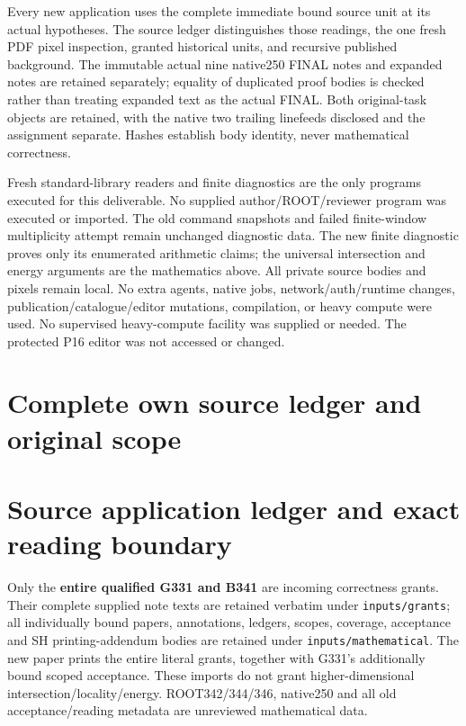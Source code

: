 \documentclass[
]{article}
\begin{document}
Every new application uses the complete immediate bound source unit at
its actual hypotheses. The source ledger distinguishes those readings,
the one fresh PDF pixel inspection, granted historical units, and
recursive published background. The immutable actual nine native250
FINAL notes and expanded notes are retained separately; equality of
duplicated proof bodies is checked rather than treating expanded text as
the actual FINAL. Both original-task objects are retained, with the
native two trailing linefeeds disclosed and the assignment separate.
Hashes establish body identity, never mathematical correctness.

Fresh standard-library readers and finite diagnostics are the only
programs executed for this deliverable. No supplied author/ROOT/reviewer
program was executed or imported. The old command snapshots and failed
finite-window multiplicity attempt remain unchanged diagnostic data. The
new finite diagnostic proves only its enumerated arithmetic claims; the
universal intersection and energy arguments are the mathematics above.
All private source bodies and pixels remain local. No extra agents,
native jobs, network/auth/runtime changes, publication/catalogue/editor
mutations, compilation, or heavy compute were used. No supervised
heavy-compute facility was supplied or needed. The protected P16 editor
was not accessed or changed.


\appendix
\section{Complete own source ledger and original scope}
\section{Source application ledger and exact reading
boundary}\label{source-application-ledger-and-exact-reading-boundary}

Only the \textbf{entire qualified G331 and B341} are incoming
correctness grants. Their complete supplied note texts are retained
verbatim under \texttt{inputs/grants}; all individually bound papers,
annotations, ledgers, scopes, coverage, acceptance and SH
printing-addendum bodies are retained under
\texttt{inputs/mathematical}. The new paper prints the entire literal
grants, together with G331's additionally bound scoped acceptance. These
imports do not grant higher-dimensional intersection/locality/energy.
ROOT342/344/346, native250 and all old acceptance/reading metadata are
unreviewed mathematical data.
\end{document}
